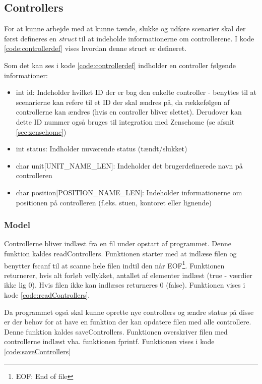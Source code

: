\subsection{Controllers}
For at kunne arbejde med at kunne tænde, slukke og udføre scenarier skal der først defineres en \textit{struct} til at indeholde informationerne om controllerene. I kode \ref{code:controllerdef} vises hvordan denne struct er defineret.


Som det kan ses i kode \ref{code:controllerdef} indholder en controller følgende informationer:
\begin{itemize}
    \item int id: Indeholder hvilket ID der er bag den enkelte controller - benyttes til at scenarierne kan refere til et ID der skal ændres på, da rækkefølgen af controllerne kan ændres (hvis en controller bliver slettet). Derudover kan dette ID nummer også bruges til integration med Zensehome (se afsnit \ref{sec:zensehome})
    \item int status: Indholder nuværende status (tændt/slukket)
    \item char unit[UNIT\_NAME\_LEN]: Indeholder det brugerdefinerede navn på controlleren
    \item char position[POSITION\_NAME\_LEN]: Indeholder informationerne om positionen på controlleren (f.eks. stuen, kontoret eller lignende)
\end{itemize}


\subsubsection*{Model}
Controllerne bliver indlæst fra en fil under opstart af programmet. Denne funktion kaldes readControllers. Funktionen starter med at indlæse filen og benytter fscanf til at scanne hele filen indtil den når EOF\footnote{EOF: End of file}. Funktionen returnerer, hvis alt forløb vellykket, antallet af elementer indlæst (true - værdier ikke lig 0). Hvis filen ikke kan indlæses returneres 0 (false). Funktionen vises i kode \ref{code:readControllers}.


Da programmet også skal kunne oprette nye controllers og ændre status på disse er der behov for at have en funktion der kan opdatere filen med alle controllere. Denne funktion kaldes saveControllers. Funktionen overskriver filen med controllerne indlæst vha. funktionen fprintf. Funktionen vises i kode \ref{code:saveControllers}

